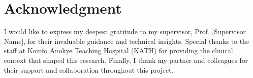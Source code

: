 \chapter*{Acknowledgment}
I would like to express my deepest gratitude to my supervisor, Prof. [Supervisor Name], for their invaluable guidance and technical insights. Special thanks to the staff at Komfo Anokye Teaching Hospital (KATH) for providing the clinical context that shaped this research. Finally, I thank my partner and colleagues for their support and collaboration throughout this project.
